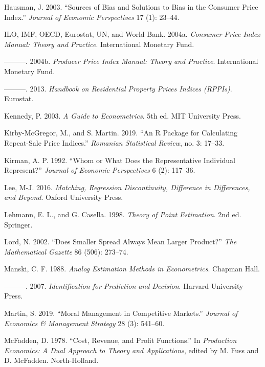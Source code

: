 \documentclass[]{article}
\begin{document}
\leavevmode\hypertarget{ref-hausman2003}{}%
Hausman, J. 2003. ``Sources of Bias and Solutions to Bias in the Consumer Price Index.'' \emph{Journal of Economic Perspectives} 17 (1): 23--44.

\leavevmode\hypertarget{ref-cpimanual}{}%
ILO, IMF, OECD, Eurostat, UN, and World Bank. 2004a. \emph{Consumer Price Index Manual: Theory and Practice}. International Monetary Fund.

\leavevmode\hypertarget{ref-ppimanual}{}%
---------. 2004b. \emph{Producer Price Index Manual: Theory and Practice}. International Monetary Fund.

\leavevmode\hypertarget{ref-rppihandbook}{}%
---------. 2013. \emph{Handbook on Residential Property Prices Indices (RPPIs)}. Eurostat.

\leavevmode\hypertarget{ref-kennedy2003}{}%
Kennedy, P. 2003. \emph{A Guide to Econometrics}. 5th ed. MIT University Press.

\leavevmode\hypertarget{ref-kirbymcgregor2019}{}%
Kirby-McGregor, M., and S. Martin. 2019. ``An R Package for Calculating Repeat-Sale Price Indices.'' \emph{Romanian Statistical Review}, no. 3: 17--33.

\leavevmode\hypertarget{ref-kirman1992}{}%
Kirman, A. P. 1992. ``Whom or What Does the Representative Individual Represent?'' \emph{Journal of Economic Perspectives} 6 (2): 117--36.

\leavevmode\hypertarget{ref-lee2016}{}%
Lee, M-J. 2016. \emph{Matching, Regression Discontinuity, Difference in Differences, and Beyond}. Oxford University Press.

\leavevmode\hypertarget{ref-lehmann1998}{}%
Lehmann, E. L., and G. Casella. 1998. \emph{Theory of Point Estimation}. 2nd ed. Springer.

\leavevmode\hypertarget{ref-lord2002}{}%
Lord, N. 2002. ``Does Smaller Spread Always Mean Larger Product?'' \emph{The Mathematical Gazette} 86 (506): 273--74.

\leavevmode\hypertarget{ref-manski1988}{}%
Manski, C. F. 1988. \emph{Analog Estimation Methods in Econometrics}. Chapman Hall.

\leavevmode\hypertarget{ref-manski2007}{}%
---------. 2007. \emph{Identification for Prediction and Decision}. Harvard University Press.

\leavevmode\hypertarget{ref-martin2019}{}%
Martin, S. 2019. ``Moral Management in Competitive Markets.'' \emph{Journal of Economics \& Management Strategy} 28 (3): 541--60.

\leavevmode\hypertarget{ref-mcfadden1978}{}%
McFadden, D. 1978. ``Cost, Revenue, and Profit Functions.'' In \emph{Production Economics: A Dual Approach to Theory and Applications}, edited by M. Fuss and D. McFadden. North-Holland.
\end{document}
